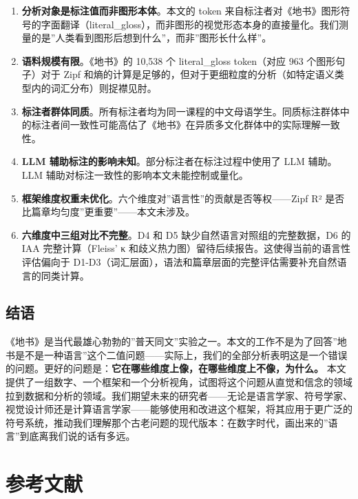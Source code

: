 \documentclass[12pt,a4paper,UTF8,fontset=founder]{ctexart}
\begin{document}
\begin{enumerate}
\def\labelenumi{\arabic{enumi}.}
\item
  \textbf{分析对象是标注值而非图形本体}。本文的 token 来自标注者对《地书》图形符号的字面翻译（literal\_gloss），而非图形的视觉形态本身的直接量化。我们测量的是''人类看到图形后想到什么''，而非''图形长什么样''。
\item
  \textbf{语料规模有限}。《地书》的 10,538 个 literal\_gloss token（对应 963 个图形句子）对于 Zipf 和熵的计算是足够的，但对于更细粒度的分析（如特定语义类型内的词汇分布）则捉襟见肘。
\item
  \textbf{标注者群体同质}。所有标注者均为同一课程的中文母语学生。同质标注群体中的标注者间一致性可能高估了《地书》在异质多文化群体中的实际理解一致性。
\item
  \textbf{LLM 辅助标注的影响未知}。部分标注者在标注过程中使用了 LLM 辅助。LLM 辅助对标注一致性的影响本文未能控制或量化。
\item
  \textbf{框架维度权重未优化}。六个维度对''语言性''的贡献是否等权------Zipf R² 是否比篇章均匀度''更重要''------本文未涉及。
\item
  \textbf{六维度中三组对比不完整}。D4 和 D5 缺少自然语言对照组的完整数据，D6 的 IAA 完整计算（Fleiss' κ 和歧义热力图）留待后续报告。这使得当前的语言性评估偏向于 D1-D3（词汇层面），语法和篇章层面的完整评估需要补充自然语言的同类计算。
\end{enumerate}

\subsection{结语}\label{ux7ed3ux8bed}

《地书》是当代最雄心勃勃的''普天同文''实验之一。本文的工作不是为了回答''地书是不是一种语言''这个二值问题------实际上，我们的全部分析表明这是一个错误的问题。更好的问题是：\textbf{它在哪些维度上像，在哪些维度上不像，为什么。} 本文提供了一组数字、一个框架和一个分析视角，试图将这个问题从直觉和信念的领域拉到数据和分析的领域。我们期望未来的研究者------无论是语言学家、符号学家、视觉设计师还是计算语言学家------能够使用和改进这个框架，将其应用于更广泛的符号系统，推动我们理解那个古老问题的现代版本：在数字时代，画出来的''语言''到底离我们说的话有多远。

\newpage

\section*{参考文献}\label{ux53c2ux8003ux6587ux732e}
\end{document}
